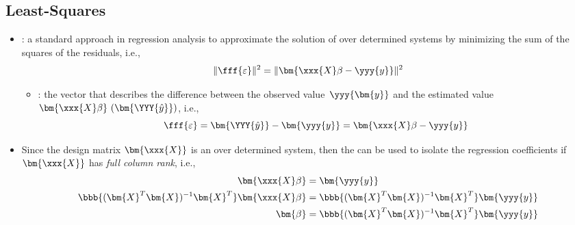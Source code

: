 \begin{itemize}
  \subsection{Least-Squares}
  \begin{itemize}
    \item {}: a standard approach in regression analysis to approximate the solution of over determined systems by minimizing the sum of the squares of the residuals, i.e.,
    \[%
    \| \fff{\varepsilon} \|^2 = \| \bm{\xxx{X}\beta - \yyy{y}}\|^2
    \]%
    \begin{itemize}
      \item {}: the vector that describes the difference{} between the observed value~\(\yyy{\bm{y}}\) and the estimated value \(\bm{\xxx{X}\beta}~(\bm{\YYY{\hat{y}}})\), i.e.,
      \[%
      \fff{\varepsilon} = \bm{\YYY{\hat{y}}} - \bm{\yyy{y}} = \bm{\xxx{X}\beta - \yyy{y}}
      \]%
    \end{itemize}
  \item Since the design matrix \(\bm{\xxx{X}}\) is an over determined system, then the  can be used to isolate the regression coefficients if \(\bm{\xxx{X}}\) has \emph{full column rank}, i.e.,
  \begin{align*}
    \bm{\xxx{X}\beta} &= \bm{\yyy{y}} \\
    \bbb{(\bm{X}^T \bm{X})^{-1} \bm{X}^T} \bm{\xxx{X}\beta} &= \bbb{(\bm{X}^T \bm{X})^{-1} \bm{X}^T} \bm{\yyy{y}} \\
    \bm{\beta} &= \bbb{(\bm{X}^T \bm{X})^{-1} \bm{X}^T} \bm{\yyy{y}}
  \end{align*}
  \end{itemize}


\end{itemize}

